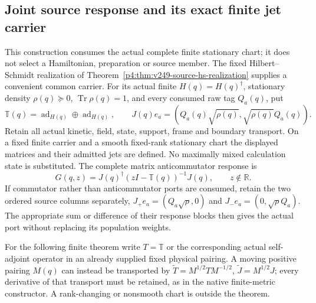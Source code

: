 \documentclass[12pt,a4paper]{article}
\begin{document}
\subsection{Joint source response and its exact finite jet carrier}
\label{p4:sec:v251-forward-joint-response}

This construction consumes the actual complete finite stationary chart;
it does not select a Hamiltonian, preparation or source member. The fixed
Hilbert--Schmidt realization of
Theorem~\ref{p4:thm:v249-source-hs-realization} supplies a convenient common
carrier. For its actual finite $H(q)=H(q)^\dagger$, stationary density
$\rho(q)\succeq0$, $\operatorname{Tr}\rho(q)=1$, and every consumed raw tag
$Q_a(q)$, put
\[
 \mathbb T(q)=\operatorname{ad}_{H(q)}\oplus\operatorname{ad}_{H(q)},
 \qquad J(q)e_a=(Q_a(q)\sqrt{\rho(q)},\sqrt{\rho(q)}Q_a(q)).
\]
Retain all actual kinetic, field, state, support, frame and boundary
transport. On a fixed finite carrier and a smooth fixed-rank stationary
chart the displayed matrices and their admitted jets are defined. No
maximally mixed calculation state is substituted. The complete matrix
anticommutator response is
\[
 G(q,z)=J(q)^\dagger(zI-\mathbb T(q))^{-1}J(q),\qquad z\notin\mathbb R.
\]
If commutator rather than anticommutator ports are consumed, retain the
two ordered source columns separately,
$J_+e_a=(Q_a\sqrt\rho,0)$ and $J_-e_a=(0,\sqrt\rho Q_a)$.
The appropriate sum or difference of their response blocks then gives
the actual port without replacing its population weights.

For the following finite theorem write $T=\mathbb T$ or the corresponding
actual self-adjoint operator in an already supplied fixed physical pairing.
A moving positive pairing $M(q)$ can instead be transported by
$\widetilde T=M^{1/2}TM^{-1/2}$, $\widetilde J=M^{1/2}J$; every derivative
of that transport must be retained, as in the native finite-metric
constructor. A rank-changing or nonsmooth chart is outside the theorem.
\end{document}
